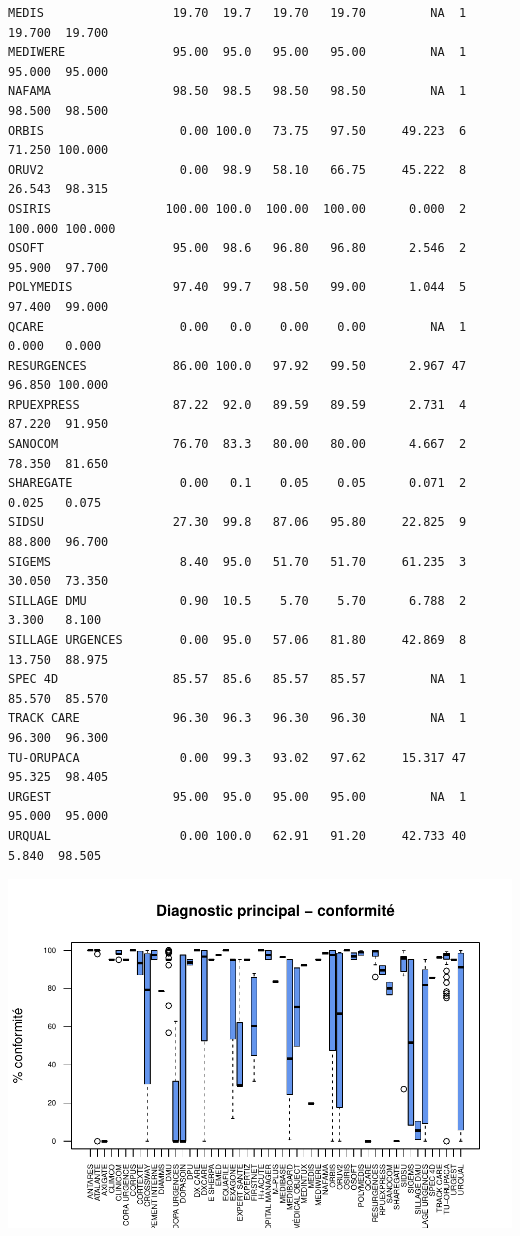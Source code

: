 \documentclass[]{article}
\begin{document}
\begin{verbatim}
MEDIS                  19.70  19.7   19.70   19.70         NA  1  19.700  19.700
MEDIWERE               95.00  95.0   95.00   95.00         NA  1  95.000  95.000
NAFAMA                 98.50  98.5   98.50   98.50         NA  1  98.500  98.500
ORBIS                   0.00 100.0   73.75   97.50     49.223  6  71.250 100.000
ORUV2                   0.00  98.9   58.10   66.75     45.222  8  26.543  98.315
OSIRIS                100.00 100.0  100.00  100.00      0.000  2 100.000 100.000
OSOFT                  95.00  98.6   96.80   96.80      2.546  2  95.900  97.700
POLYMEDIS              97.40  99.7   98.50   99.00      1.044  5  97.400  99.000
QCARE                   0.00   0.0    0.00    0.00         NA  1   0.000   0.000
RESURGENCES            86.00 100.0   97.92   99.50      2.967 47  96.850 100.000
RPUEXPRESS             87.22  92.0   89.59   89.59      2.731  4  87.220  91.950
SANOCOM                76.70  83.3   80.00   80.00      4.667  2  78.350  81.650
SHAREGATE               0.00   0.1    0.05    0.05      0.071  2   0.025   0.075
SIDSU                  27.30  99.8   87.06   95.80     22.825  9  88.800  96.700
SIGEMS                  8.40  95.0   51.70   51.70     61.235  3  30.050  73.350
SILLAGE DMU             0.90  10.5    5.70    5.70      6.788  2   3.300   8.100
SILLAGE URGENCES        0.00  95.0   57.06   81.80     42.869  8  13.750  88.975
SPEC 4D                85.57  85.6   85.57   85.57         NA  1  85.570  85.570
TRACK CARE             96.30  96.3   96.30   96.30         NA  1  96.300  96.300
TU-ORUPACA              0.00  99.3   93.02   97.62     15.317 47  95.325  98.405
URGEST                 95.00  95.0   95.00   95.00         NA  1  95.000  95.000
URQUAL                  0.00 100.0   62.91   91.20     42.733 40   5.840  98.505
\end{verbatim}

\includegraphics{septembre2015_files/figure-latex/unnamed-chunk-24-1.pdf}
\end{document}
